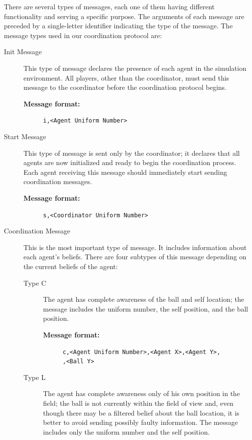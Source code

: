 There are several types of messages, each one of them having different functionality and serving a specific purpose. The arguments of each message are preceded by a single-letter identifier indicating the type of the message. The message types used in our coordination protocol are:
\begin{description}
\item[Init Message] This type of message declares the presence of each agent in the simulation environment. All players, other than the coordinator, must send this message to the coordinator before the coordination protocol begins.
\begin{description}
  \item[{\bf Message format:}] 
  \texttt{i,<Agent Uniform Number> }
\end{description}

\item[Start Message] This type of message is sent only by the coordinator; it declares that all agents are now initialized and ready to begin the coordination process. Each agent receiving this message should immediately start sending coordination messages.

\begin{description}
  \item[{\bf Message format:}] 
  \texttt{s,<Coordinator Uniform Number>}
\end{description}

\item[Coordination Message] This is the most important type of message. It includes information about each agent's beliefs. There are four subtypes of this message depending on  the current beliefs of the agent:
\begin{description}

\item[Type C] The agent has complete awareness of the ball and self location; the message includes the uniform number, the self position, and the ball position.

\begin{description}
  \item[{\bf Message format:}]
  \texttt{c,<Agent Uniform Number>,<Agent X>,<Agent Y>,\\<Ball X>,<Ball Y>}
\end{description}

\item[Type L] The agent has complete awareness only of his own position in the field; the ball is not currently within the field of view and, even though there may be a filtered belief about the ball location, it is better to avoid sending possibly faulty information. The message includes only the uniform number and the self position.


\end{description}
\end{description}
